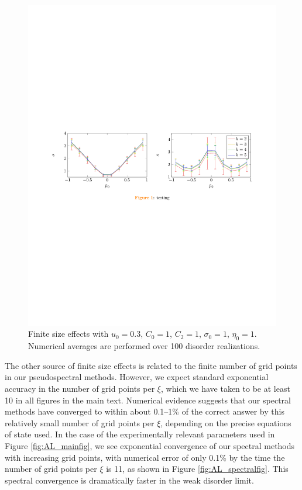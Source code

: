 \begin{figure}[t]
\centering
\includegraphics[width=\textwidth]{figures/appendix/theory/finitesizeplot1.pdf}
\caption{Finite size effects with $u_0=0.3$, $C_0=1$, $C_2=1$, $\sigma_0=1$, $\eta_0=1$.  Numerical averages are performed over 100 disorder realizations.}
\label{fig:AL_finitesizeplot}
\end{figure}


The other source of finite size effects is related to the finite number of grid points in our pseudospectral methods.   However, we expect standard exponential accuracy \cite{trefethen_spectral_2001} in the number of grid points per $\xi$, which we have taken to be at least 10 in all figures in the main text.   Numerical evidence suggests that our spectral methods have converged to within about 0.1--1\% of the correct answer by this relatively small number of grid points per $\xi$, depending on the precise equations of state used.  In the case of the experimentally relevant parameters used in Figure \ref{fig:AL_mainfig}, we see exponential convergence of our spectral methods with increasing grid points, with numerical error of only 0.1\% by the time the number of grid points per $\xi$ is 11, as shown in Figure \ref{fig:AL_spectralfig}.     This spectral convergence is dramatically faster in the weak disorder limit.

